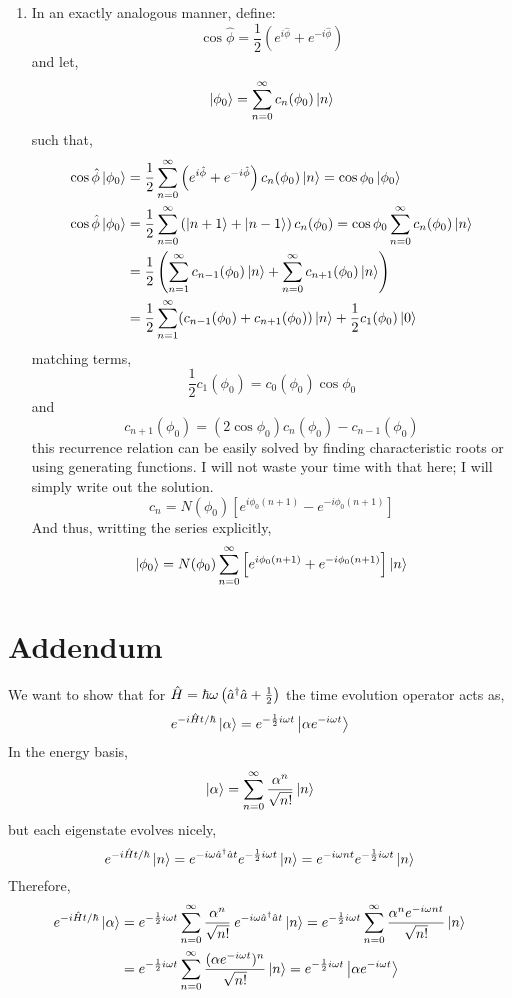 \documentclass[12pt]{extarticle}
\begin{document}
\begin{enumerate}
\item In an exactly analogous manner, define: \[\cos{\hat{\phi}} = \frac{1}{2} \left( e^{i \hat{\phi}} + e^{-i \hat{\phi}} \right)\] and let, \[\left| \phi_0 \right> = \sum_{n = 0}^{\infty} c_n (\phi_0) \left| n \right>\]
such that, 
\begin{align*}
\cos{\hat{\phi}} \left| \phi_0 \right> &= \frac{1}{2} \sum_{n = 0}^{\infty} \left( e^{i \hat{\phi}} + e^{-i \hat{\phi}} \right) c_n (\phi_0) \left| n \right>  = \cos{\phi_0} \left| \phi_0 \right> \\ 
\cos{\hat{\phi}} \left| \phi_0 \right> &= \frac{1}{2} \sum_{n = 0}^{\infty} \left( \left| n + 1 \right> + \left| n - 1 \right> \right) c_n (\phi_0) = \cos{\phi_0} \sum_{n = 0}^{\infty} c_n (\phi_0) \left| n \right> \\ 
& = \frac{1}{2} \left( \sum_{n = 1}^{\infty} c_{n - 1} (\phi_0) \left| n \right>  + \sum_{n = 0}^{\infty} c_{n + 1} (\phi_0) \left| n \right> \right)\\ & = \frac{1}{2}  \sum_{n = 1}^{\infty} (c_{n - 1}(\phi_0) + c_{n + 1} (\phi_0)) \left| n \right> + \frac{1}{2} c_1(\phi_0) \left| 0 \right>
\end{align*}
matching terms,
\[ \frac{1}{2} c_1(\phi_0) = c_0(\phi_0) \cos{\phi_0}\]
and 
\[c_{n + 1} (\phi_0) = (2 \cos{\phi_0}) c_{n}(\phi_0) - c_{n - 1}(\phi_0) \]
this recurrence relation can be easily solved by finding characteristic roots or using generating functions. I will not waste your time with that here; I will simply write out the solution.
\[c_n = N(\phi_0) \left[e^{i \phi_0 (n + 1)} - e^{- i \phi_0 (n + 1)} \right]\] 
And thus, writting the series explicitly,
\[\left| \phi_0 \right> = N(\phi_0) \sum_{n = 0}^\infty \left[e^{i \phi_0 (n + 1)} + e^{- i \phi_0 (n + 1)} \right] \left| n \right> \]  
\end{enumerate}

\section*{Addendum}
We want to show that for $\hat{H} = \hbar \omega \left(\hat{a}^\dagger \hat{a} + \frac{1}{2}\right)$ the time evolution operator acts as, \[e^{-i\hat{H} t/\hbar} \left| \alpha \right> = e^{-\frac{1}{2} i \omega t} \left| \alpha e^{-i \omega t} \right>\]
In the energy basis, 
\[\left| \alpha \right> = \sum_{n = 0}^\infty \frac{\alpha^n}{\sqrt{n!}} \left| n \right>\]
but each eigenstate evolves nicely,
\[e^{- i \hat{H} t / \hbar} \left| n \right> = e^{- i \omega \hat{a}^\dagger \hat{a} t} e^{- \frac{1}{2} i \omega t} \left| n \right> = e^{- i \omega n t} e^{- \frac{1}{2} i \omega t} \left| n \right>\]
Therefore, 
\begin{align*}
e^{- i \hat{H} t / \hbar} \left| \alpha \right> & = e^{- \frac{1}{2} i \omega t} \sum_{n = 0}^\infty \frac{\alpha^n}{\sqrt{n!}} \: e^{- i \omega \hat{a}^\dagger \hat{a} t} \left| n \right> = e^{- \frac{1}{2} i \omega t} \sum_{n = 0}^\infty \frac{\alpha^n e^{- i \omega n t} }{\sqrt{n!}} \left| n \right> \\ & = e^{- \frac{1}{2} i \omega t} \sum_{n = 0}^\infty \frac{(\alpha e^{- i \omega t})^n }{\sqrt{n!}} \left| n \right> = e^{-\frac{1}{2} i \omega t} \left| \alpha e^{-i \omega t} \right>
\end{align*} 
\end{document}
